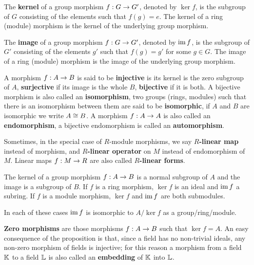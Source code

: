 The \textbf{kernel} of a group morphism $f:G\rightarrow G'$,
denoted by $\ker f$, is the subgroup of $G$ consisting of the elements
such that $f(g)=e$. The kernel of a ring (module) morphism is the
kernel of the underlying group morphism.

The \textbf{image} of a group morphism $f:G\rightarrow G'$,
denoted by $\operatorname{im} f$, is the subgroup of $G'$ consisting of the elements
$g'$ such that $f(g)=g'$ for some $g\in G$. The image of a ring
(module) morphism is the image of the underlying group morphism.

A morphism $f:A\rightarrow B$ is said to be
\textbf{injective} is its kernel is the zero
subgroup of $A$, \textbf{surjective} if its
image is the whole $B$, \textbf{bijective}
if it is both. A bijective morphism is also called an
\textbf{isomorphism}, two groups (rings, modules)
such that there is an isomorphism between them are said to be
\textbf{isomorphic}, if $A$ and $B$ are isomorphic
we write $A\cong B$. A morphism $f:A\rightarrow A$ is also called an
\textbf{endomorphism}, a bijective endomorphism is
called an
\textbf{automorphism}. 

Sometimes, in the special case of $R$-module morphisms, we say
\textbf{$R$-linear map} instead of morphism, and
\textbf{$R$-linear operator} on $M$ instead of
endomorphism of $M$. Linear maps $f:M\rightarrow R$ are also called
 \textbf{$R$-linear
  forms}.

\begin{proposition}
  \label{th:first-isomorphism}
  The kernel of a group morphism $f:A\rightarrow B$ is a normal subgroup of
  $A$ and the image is a subgroup of $B$.  If $f$ is a ring morphism,
  $\ker f$ is an ideal and $\operatorname{im} f$ a subring. If $f$ is a module
  morphism, $\ker f$ and $\operatorname{im} f$ are both submodules.
  
  In each of these cases $\operatorname{im} f$ is isomorphic to $A/\ker f$ as a
  group/ring/module.
\end{proposition}

 \textbf{Zero morphisms} are those
morphisms $f:A\rightarrow B$ such that $\ker f = A$.  An easy consequence of
the proposition is that, since a field has no non-trivial ideals, any
non-zero morphism of fields is injective; for this reason a morphism
from a field $\mathbb{K}$ to a field $\mathbb{L}$ is also called an
\textbf{embedding} of $\mathbb{K}$ into $\mathbb{L}$.

